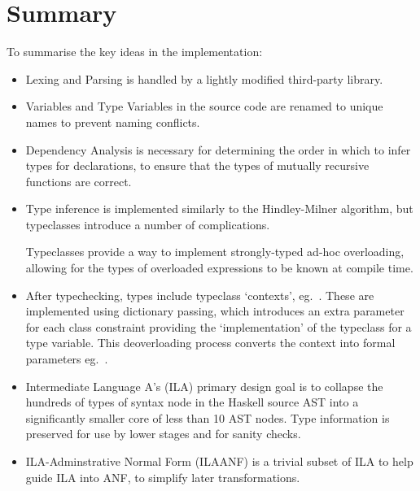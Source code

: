 \documentclass[dissertation.tex]{subfiles}
\begin{document}
\section{Summary}
{

    To summarise the key ideas in the implementation:

    \begin{itemize}
    \item Lexing and Parsing is handled by a lightly modified third-party library.
    \item Variables and Type Variables in the source code are renamed to unique names to prevent naming conflicts.
    \item
    {

        Dependency Analysis is necessary for determining the order in which to infer types for declarations, to ensure
        that the types of mutually recursive functions are correct.

    }
    \item
    {

        Type inference is implemented similarly to the Hindley-Milner algorithm, but typeclasses introduce a number of
        complications.
        
        Typeclasses provide a way to implement strongly-typed ad-hoc overloading, allowing for the types of overloaded
        expressions to be known at compile time.

    }
    \item
    {

        After typechecking, types include typeclass `contexts', eg.\ . These are
        implemented using dictionary passing, which introduces an extra parameter for each class constraint providing
        the `implementation' of the typeclass for a type variable. This deoverloading process converts the context into
        formal parameters eg.\ .

    }
    \item
    {
        
        Intermediate Language A's (ILA) primary design goal is to collapse the hundreds of types of syntax node in the
        Haskell source AST into a significantly smaller core of less than 10 AST nodes. Type information is preserved
        for use by lower stages and for sanity checks.

    }
    \item
    {

        ILA-Adminstrative Normal Form (ILAANF) is a trivial subset of ILA to help guide ILA into ANF, to simplify later
        transformations.

}
\end{itemize}}
\end{document}

